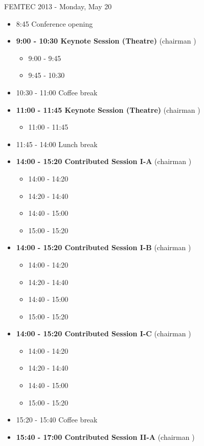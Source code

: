 \documentclass[10pt, A4]{article}%
\begin{document}
\centerline{\huge FEMTEC 2013 - Monday, May 20}
\vspace{4mm}

\begin{itemize}    
  \item 8:45 Conference opening
  \item {\bf 9:00 - 10:30 Keynote Session (Theatre)} (chairman ) 
  \begin{itemize}
    \item 9:00 - 9:45
    \item 9:45 - 10:30 
  \end{itemize}
  \item 10:30 - 11:00 Coffee break
  \item {\bf 11:00 - 11:45 Keynote Session (Theatre)} (chairman ) 
  \begin{itemize}
    \item 11:00 - 11:45
  \end{itemize}
  \item 11:45 - 14:00 Lunch break      
  \item {\bf 14:00 - 15:20 Contributed Session I-A} (chairman ) 
  \begin{itemize}
    \item 14:00 - 14:20 
    \item 14:20 - 14:40 
    \item 14:40 - 15:00 
    \item 15:00 - 15:20
  \end{itemize}
  \item {\bf 14:00 - 15:20 Contributed Session I-B} (chairman ) 
  \begin{itemize}
    \item 14:00 - 14:20 
    \item 14:20 - 14:40 
    \item 14:40 - 15:00 
    \item 15:00 - 15:20 
  \end{itemize}
    \item {\bf 14:00 - 15:20 Contributed Session I-C} (chairman ) 
  \begin{itemize}
    \item 14:00 - 14:20 
    \item 14:20 - 14:40 
    \item 14:40 - 15:00 
    \item 15:00 - 15:20 
  \end{itemize}
  \item 15:20 - 15:40 Coffee break
  \item {\bf 15:40 - 17:00 Contributed Session II-A} (chairman ) 

\end{itemize}
\end{document}
